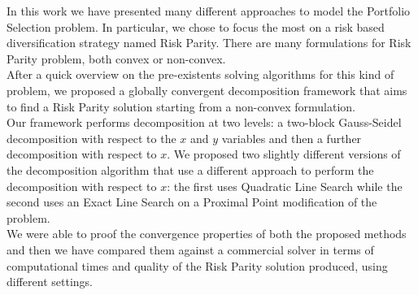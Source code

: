 In this work we have presented many different approaches to model the Portfolio Selection problem. In particular, we chose to focus the most on a risk based diversification strategy named Risk Parity. There are many formulations for Risk Parity problem, both convex or non-convex.\\ After a quick overview on the pre-existents solving algorithms for this kind of problem, we proposed a globally convergent decomposition framework that aims to find a Risk Parity solution starting from a non-convex formulation.\\ Our framework performs decomposition at two levels: a two-block Gauss-Seidel decomposition with respect to the $x$ and $y$ variables and then a further decomposition with respect to $x$. We proposed two slightly different versions of the decomposition algorithm that use a different approach to perform the decomposition with respect to $x$: the first uses Quadratic Line Search while the second uses an Exact Line Search on a Proximal Point modification of the problem.\\ We were able to proof the convergence properties of both the proposed methods and then we have compared them against a commercial solver in terms of computational times and quality of the Risk Parity solution produced, using different settings. 